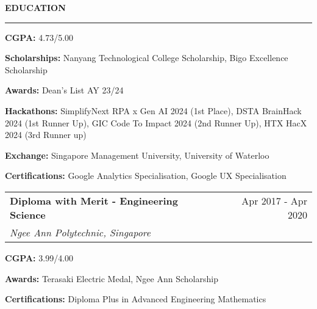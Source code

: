 \documentclass[11pt,letterpaper]{article}
\makeatletter
\newcommand{\resheading}[1]{%
  \vspace{2pt}
  {\normalsize \textbf{\MakeUppercase{#1}}}\\
  \vspace{-8pt}
  \hrule
}
\newcommand{\resitem}[1]{\item \small #1 \vspace{-2pt}}
\newcommand{\ressubheading}[4]{
    \vspace{2pt}
    \begin{tabular*}{\textwidth}{l@{\extracolsep{\fill}}r}
        \small \textbf{#1} & \small #2 \\
        \small \textit{#3} & \small \textit{#4} \\
    \end{tabular*}\vspace{-3pt}}
\makeatother
\begin{document}
\resheading{Education}
\begin{leftitemize}
\item[]
\begin{subitemize}
    \resitem{\textbf{CGPA:} 4.73/5.00}
    \resitem{\textbf{Scholarships:} Nanyang Technological College Scholarship, Bigo Excellence Scholarship}
    \resitem{\textbf{Awards:} Dean's List AY 23/24}
    \resitem{\textbf{Hackathons:} SimplifyNext RPA x Gen AI 2024 (1st Place), DSTA BrainHack 2024 (1st Runner Up), GIC Code To Impact 2024 (2nd Runner Up), HTX HacX 2024 (3rd Runner up)}
    \resitem{\textbf{Exchange:} Singapore Management University, University of Waterloo}
    \resitem{\textbf{Certifications:} Google Analytics Specialisation, Google UX Specialisation}
\end{subitemize}

\item[]
\ressubheading{Diploma with Merit - Engineering Science}{Apr 2017 - Apr 2020}{Ngee Ann Polytechnic, Singapore}{}
\begin{subitemize}
    \resitem{\textbf{CGPA:} 3.99/4.00}
    \resitem{\textbf{Awards:} Terasaki Electric Medal, Ngee Ann Scholarship}
    \resitem{\textbf{Certifications:} Diploma Plus in Advanced Engineering Mathematics}
\end{subitemize}
\end{leftitemize}
\end{document}

